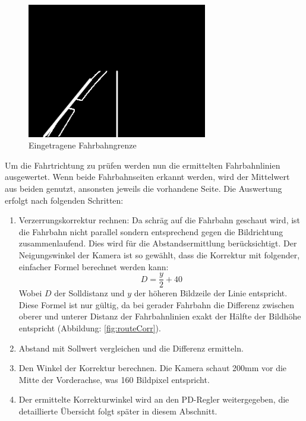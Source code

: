\begin{figure}[H]%
\centering
\includegraphics[width=0.7\textwidth]{03_Loesungskonzept/pictures/Fahrbahnlinien.png}
\caption{Eingetragene Fahrbahngrenze}
\label{fig:routeLimits}
\end{figure}
Um die Fahrtrichtung zu prüfen werden nun die ermittelten Fahrbahnlinien ausgewertet. Wenn beide Fahrbahnseiten erkannt werden, wird der Mittelwert aus beiden genutzt, ansonsten jeweils die vorhandene Seite. Die Auswertung erfolgt nach folgenden Schritten:
\begin{enumerate}
\item Verzerrungskorrektur rechnen: Da schräg auf die Fahrbahn geschaut wird, ist die Fahrbahn nicht parallel sondern entsprechend gegen die Bildrichtung zusammenlaufend. Dies wird für die Abstandsermittlung berücksichtigt. Der Neigungswinkel der Kamera ist so gewählt, dass die Korrektur mit folgender, einfacher Formel berechnet werden kann:
\[
D = \frac{y}{2} + 40 
\]
Wobei $D$ der Solldistanz und $y$ der höheren Bildzeile der Linie entspricht. Diese Formel ist nur gültig, da bei gerader Fahrbahn die Differenz zwischen oberer und unterer Distanz der Fahrbahnlinien exakt der Hälfte der Bildhöhe entspricht (Abbildung: \ref{fig:routeCorr}).
\item Abstand mit Sollwert vergleichen und die Differenz ermitteln.
\item Den Winkel der Korrektur berechnen. Die Kamera schaut 200mm vor die Mitte der Vorderachse, was 160 Bildpixel entspricht.
\item Der ermittelte Korrekturwinkel wird an den PD-Regler weitergegeben, die detaillierte Übersicht folgt später in diesem Abschnitt.
\end{enumerate}
